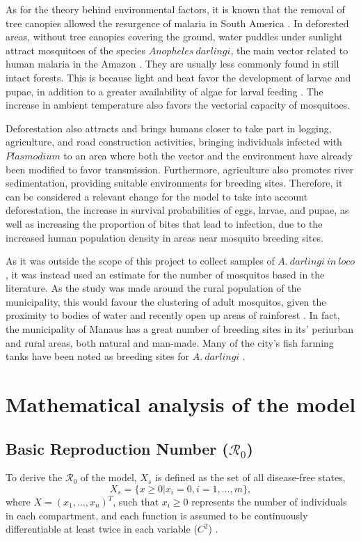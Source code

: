 \documentclass[a4paper,fleqn]{cas-dc}
\begin{document}
As for the theory behind environmental factors, it is known that the removal of tree canopies allowed 
the resurgence of malaria in South America \cite{Norris2004}. In deforested areas, 
without tree canopies covering the ground, water puddles under sunlight 
attract mosquitoes of the species $Anopheles \ darlingi$, the main vector 
related to human malaria in the Amazon \cite{infoAnopheles}. They are 
usually less commonly found in still intact forests. This is 
because light and heat favor the development of larvae and 
pupae, in addition to a greater availability of algae for 
larval feeding \cite{article_alteracoesambientais}. The increase 
in ambient temperature also favors the vectorial capacity of 
mosquitoes. 

Deforestation also attracts and brings humans closer 
to take part in logging, agriculture, and road construction 
activities, bringing individuals infected with $Plasmodium$ to 
an area where both the vector and the environment have already 
been modified to favor transmission. Furthermore, agriculture 
also promotes river sedimentation, providing suitable environments 
for breeding sites. Therefore, it can be considered a relevant 
change for the model to take into account deforestation, the 
increase in survival probabilities of eggs, larvae, and pupae, 
as well as increasing the proportion of bites that lead to infection, 
due to the increased human population density in areas near mosquito 
breeding sites.

As it was outside the scope of this project to collect samples of $A. \ darlingi \ in \ loco$, it was instead used 
an estimate for the number of mosquitos based in the literature. As the study was made around the rural population of the municipality,
this would favour the clustering of adult mosquitos, given the proximity to bodies of water and recently open up areas of rainforest \cite{Biological_Variation_Anopheles}. 
In fact, the municipality of Manaus has a great number of breeding sites in its' periurban and rural areas, both natural and man-made. Many of the city's fish farming tanks 
have been noted as breeding sites for $A. \ darlingi$ \cite{Abundancia_Larval}.

\section{Mathematical analysis of the model}

\subsection{Basic Reproduction Number ($\mathcal{R}_0$)}
To derive the $\mathcal{R}_0$ of the model, $X_s$ is defined as the set of all disease-free states, 
$$X_s=\{x \geq 0|x_i=0, i=1,\ldots,m\},$$
where $X=(x_1,\ldots, x_n)^T$, such that $x_i\geq 0$ represents the number 
of individuals in each compartment, and each function is assumed to be 
continuously differentiable at least twice in each variable ($C^2$) \cite{Rep_Number_Comp_Model}.
\end{document}
